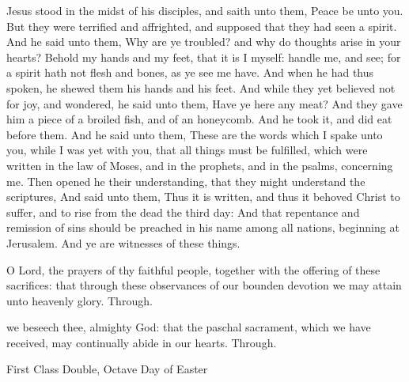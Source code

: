  Jesus stood in the midst of his disciples, and saith unto them, Peace be unto you. But they were terrified and affrighted, and supposed that they had seen a spirit. And he said unto them, Why are ye troubled? and why do thoughts arise in your hearts? Behold my hands and my feet, that it is I myself: handle me, and see; for a spirit hath not flesh and bones, as ye see me have. And when he had thus spoken, he shewed them his hands and his feet. And while they yet believed not for joy, and wondered, he said unto them, Have ye here any meat? And they gave him a piece of a broiled fish, and of an honeycomb. And he took it, and did eat before them. And he said unto them, These are the words which I spake unto you, while I was yet with you, that all things must be fulfilled, which were written in the law of Moses, and in the prophets, and in the psalms, concerning me. Then opened he their understanding, that they might understand the scriptures, And said unto them, Thus it is written, and thus it behoved Christ to suffer, and to rise from the dead the third day: And that repentance and remission of sins should be preached in his name among all nations, beginning at Jerusalem. And ye are witnesses of these things.


\secret
{} O Lord, the prayers of thy faithful people, together with the offering of these sacrifices: that through these observances of our bounden devotion we may attain unto heavenly glory. Through.


\postcommunion
{} we beseech thee, almighty God: that the paschal sacrament, which we have received, may continually abide in our hearts. Through.

\begin{inhead}
    {First Class Double, Octave Day of Easter}
\end{inhead}
\par\noindent
{}

